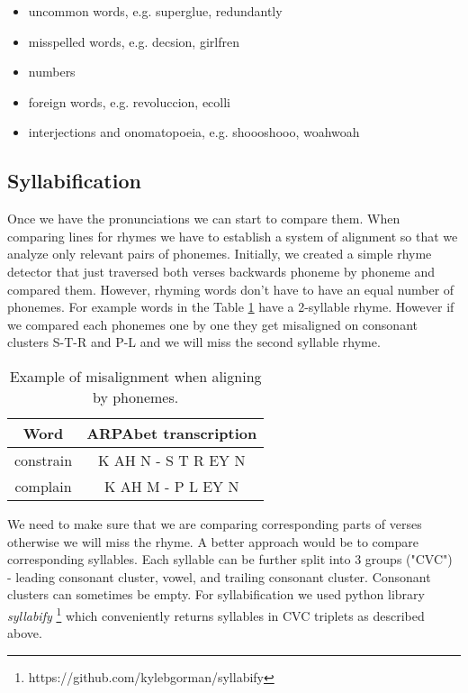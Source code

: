 \begin{itemize}
	\item uncommon words, e.g. superglue, redundantly
	\item misspelled words, e.g. decsion, girlfren
	\item numbers
	\item foreign words, e.g. revoluccion, ecolli
	\item interjections and onomatopoeia, e.g. shoooshooo, woahwoah
\end{itemize}


\subsection{Syllabification}
Once we have the pronunciations we can start to compare them. When comparing lines for rhymes we have to establish a system of alignment so that we analyze only relevant pairs of phonemes. Initially, we created a simple rhyme detector that just traversed both verses backwards phoneme by phoneme and compared them. However, rhyming words don't have to have an equal number of phonemes. For example words in the Table \ref{phon_misalign_table} have a 2-syllable rhyme. However if we compared each phonemes one by one they get misaligned on consonant clusters S-T-R and P-L and we will miss the second syllable rhyme.

\begin{table}[h!]
	\centering
	\begin{tabular}{c c} 
		Word & ARPAbet transcription \\ [0.5ex] 
		\hline
		constrain & K AH N - S T R EY N \\ 
		complain & K AH M - P L EY N \\
	\end{tabular}
	\caption{Example of misalignment when aligning by phonemes.}
	\label{phon_misalign_table}
\end{table}

We need to make sure that we are comparing corresponding parts of verses otherwise we will miss the rhyme. A better approach would be to compare corresponding syllables. Each syllable can be further split into 3 groups ("CVC") - leading consonant cluster, vowel, and trailing consonant cluster. Consonant clusters can sometimes be empty. For syllabification we used python library \textit{syllabify} \footnote{https://github.com/kylebgorman/syllabify} which conveniently returns syllables in CVC triplets as described above.

